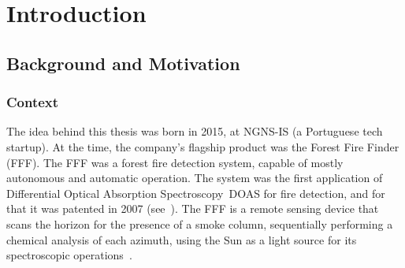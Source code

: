 \newcommand{\novathesis}{\emph{novathesis}}
\newcommand{\novathesisclass}{\texttt{novathesis.cls}}


\chapter{Introduction}
\label{cha:introduction}

\section{Background and Motivation}%
\label{sec:bg_and_motivation}

\subsection{Context}%
\label{sub:context}

The idea behind this thesis was born in 2015, at NGNS-IS (a Portuguese
tech startup). At the time, the company's flagship product was the
Forest Fire Finder (\gls{FFF}). The \gls{FFF} was a forest fire
detection system, capable of mostly autonomous and automatic operation.
The system was the first application of Differential Optical Absorption
Spectroscopy~\gls{DOAS} for fire detection, and for that it was patented
in 2007 (see~\cite{Vieira2007, Application2008}). The \gls{FFF} is a
remote sensing device that scans the horizon for the presence of a smoke
column, sequentially performing a chemical analysis of each azimuth,
using the Sun as a light source for its spectroscopic
operations~\cite{ValentedeAlmeida2017}.

